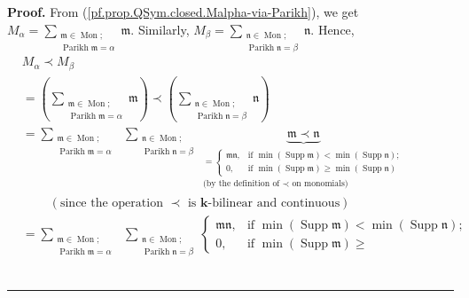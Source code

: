 \documentclass
[numbers=enddot,12pt,final,onecolumn,notitlepage,abstracton]{scrartcl}%
\theoremstyle{definition}
\newenvironment{proof}[1][Proof]{\noindent\textbf{#1.} }{\ \rule{0.5em}{0.5em}}
\newenvironment{verlong}{}{}
\let\sumnonlimits\sum
\renewcommand{\sum}{\sumnonlimits\limits}
\begin{document}
\begin{proof}
\begin{verlong}
From (\ref{pf.prop.QSym.closed.Malpha-via-Parikh}), we get $M_{\alpha}%
=\sum_{\substack{\mathfrak{m}\in\operatorname*{Mon};\\\operatorname*{Parikh}%
\mathfrak{m}=\alpha}}\mathfrak{m}$. Similarly, $M_{\beta}=\sum
_{\substack{\mathfrak{n}\in\operatorname*{Mon};\\\operatorname*{Parikh}%
\mathfrak{n}=\beta}}\mathfrak{n}$. Hence,%
\begin{align*}
&  M_{\alpha}\left.  \prec\right.  M_{\beta}\\
&  =\left(  \sum_{\substack{\mathfrak{m}\in\operatorname*{Mon}%
;\\\operatorname*{Parikh}\mathfrak{m}=\alpha}}\mathfrak{m}\right)  \left.
\prec\right.  \left(  \sum_{\substack{\mathfrak{n}\in\operatorname*{Mon}%
;\\\operatorname*{Parikh}\mathfrak{n}=\beta}}\mathfrak{n}\right) \\
&  =\sum_{\substack{\mathfrak{m}\in\operatorname*{Mon}%
;\\\operatorname*{Parikh}\mathfrak{m}=\alpha}}\ \ \sum_{\substack{\mathfrak{n}%
\in\operatorname*{Mon};\\\operatorname*{Parikh}\mathfrak{n}=\beta
}}\underbrace{\mathfrak{m}\left.  \prec\right.  \mathfrak{n}}_{\substack{=%
\begin{cases}
\mathfrak{mn}, & \text{if }\min\left(  \operatorname*{Supp}\mathfrak{m}%
\right)  <\min\left(  \operatorname*{Supp}\mathfrak{n}\right)  ;\\
0, & \text{if }\min\left(  \operatorname*{Supp}\mathfrak{m}\right)  \geq
\min\left(  \operatorname*{Supp}\mathfrak{n}\right)
\end{cases}
\\\text{(by the definition of }\left.  \prec\right.  \text{ on monomials)}}}\\
&  \ \ \ \ \ \ \ \ \ \ \left(  \text{since the operation }\left.
\prec\right.  \text{ is }\mathbf{k}\text{-bilinear and continuous}\right) \\
&  =\sum_{\substack{\mathfrak{m}\in\operatorname*{Mon}%
;\\\operatorname*{Parikh}\mathfrak{m}=\alpha}}\ \ \sum_{\substack{\mathfrak{n}%
\in\operatorname*{Mon};\\\operatorname*{Parikh}\mathfrak{n}=\beta}}%
\begin{cases}
\mathfrak{mn}, & \text{if }\min\left(  \operatorname*{Supp}\mathfrak{m}%
\right)  <\min\left(  \operatorname*{Supp}\mathfrak{n}\right)  ;\\
0, & \text{if }\min\left(  \operatorname*{Supp}\mathfrak{m}\right)  \geq

\end{cases}
\end{align*}
\end{verlong}
\end{proof}
\end{document}

